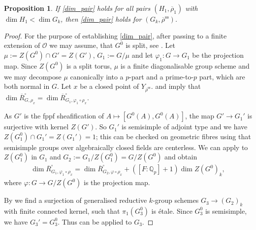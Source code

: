 \documentclass{amsart}
\newtheorem{prop}{Proposition}[section]
\theoremstyle{definition}
\theoremstyle{remark}
\newcommand{\Qp}{\mathbb {Q}_p}
\newcommand{\OO}{\mathcal O}
\newcommand{\rhobar}{\overline{\rho}}
\newcommand{\rhobarss}{\rhobar^{\mathrm{ss}}}
\newcommand{\Rbar}{\overline{R}}
\begin{document}
\begin{prop}\label{some_prop}
    If \eqref{dim_pair} holds for all pairs $(H_1, \rhobar_1)$ with $\dim H_1 < \dim G_k$, then \eqref{dim_pair} 
    holds for $(G_k, \rhobarss)$. 
\end{prop}

\begin{proof} 
    For the purpose of establishing \eqref{dim_pair}, after passing to a finite extension of $\OO$ we may assume, that $G^0$ is split, see . 
    Let $\mu := Z(G^0) \cap G' = Z(G')$, $G_1 := G/\mu$ and let $\varphi_1 : G \to G_1$ be the projection map. 
    Since $Z(G^0)$ is a split torus, $\mu$ is a finite diagonalisable group scheme and we may decompose 
    $\mu$ canonically  into a $p$-part and a prime-to-$p$ part, which are both normal in $G$. Let $x$ be a closed point of $Y_{\rhobarss}$.
    and  imply that $\dim \Rbar^{\square}_{G, \rho_x}= \dim \Rbar^{\square}_{G_1, \varphi_1 \circ \rho_x}$.

    
    
    As $G'$ is the fppf sheafification of $A \mapsto [G^0(A), G^0(A)]$, the map  $G' \to G_1'$ is surjective with kernel $Z(G')$.
    So $G_1'$ is semisimple of adjoint type and we have $Z(G_1^0) \cap G_1' = Z(G_1') = 1$; this can be checked on geometric fibres using that semisimple groups over algebraically closed fields are centerless.
    We can apply  to $Z(G_1^0)$ in $G_1$ and $G_2 := G_1/Z(G_1^0) = G/Z(G^0)$ and obtain
    \begin{align}
        \dim \Rbar^{\square}_{G_1, \varphi_1 \circ \rho_x}= \dim \Rbar^{\square}_{G_2, \varphi \circ \rho_x} + ([F:\Qp]+1) \dim Z(G^0)_k, \label{torus_transfer}
    \end{align}
   where $\varphi : G \to G/Z(G^0)$ is the projection map. 
   
    By  we find a surjection of generalised reductive $k$-group schemes $G_3 \to (G_2)_k$ with finite connected kernel, such that $\pi_1(G_3^0)$ is \'etale.
    Since $G_3^0$ is semisimple, we have $G_3' = G_3^0$. Thus  can be applied to $G_3$.


\end{proof}
\end{document}
